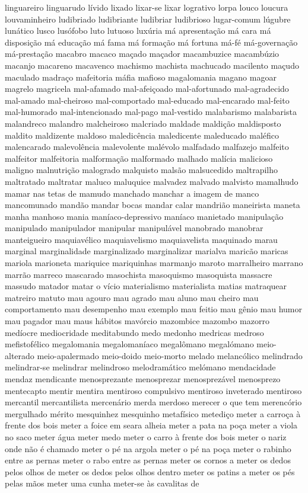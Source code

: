 linguareiro linguarudo l\'{i}vido lixado lixar-se lixar logrativo lorpa louco loucura louvaminheiro ludibriado ludibriante ludibriar ludibrioso lugar-comum l\'{u}gubre lun\'{a}tico lusco lus\'{o}fobo luto lutuoso lux\'{u}ria m\'{a} apresenta\c{c}\~ao m\'{a} cara m\'{a} disposi\c{c}\~ao m\'{a} educa\c{c}\~ao m\'{a} fama m\'{a} forma\c{c}\~ao m\'{a} fortuna m\'{a}-f\'{e} m\'{a}-governa\c{c}\~ao m\'{a}-presta\c{c}\~ao macabro macaco ma\c{c}ado ma\c{c}ador macambuzice macamb\'{u}zio macanjo macareno macavenco machismo machista machucado macilento ma\c{c}udo maculado madra\c{c}o mafeitoria m\'{a}fia mafioso magalomania magano magoar magrelo magricela mal-afamado mal-afei\c{c}oado mal-afortunado mal-agradecido mal-amado mal-cheiroso mal-comportado mal-educado mal-encarado mal-feito mal-humorado mal-intencionado mal-pago mal-vestido malabarismo malabarista malandreco malandro malcheiroso malcriado maldade maldi\c{c}\~ao maldisposto maldito maldizente maldoso maledic\^{e}ncia maledicente maleducado mal\'{e}fico malencarado malevol\^{e}ncia malevolente mal\'{e}volo malfadado malfazejo malfeito malfeitor malfeitoria malforma\c{c}\~ao malformado malhado mal\'{i}cia malicioso maligno malnutri\c{c}\~ao malogrado malquisto mals\~ao malsucedido maltrapilho maltratado maltratar maluco maluquice malvadez malvado malvisto mamalhudo mamar nas tetas de mamudo manchado manchar a imagem de manco mancomunado mand\~ao mandar bocas mandar calar mandri\~ao maneirista maneta manha manhoso mania man\'{i}aco-depressivo man\'{i}aco manietado manipula\c{c}\~ao manipulado manipulador manipular manipul\'{a}vel manobrado manobrar manteigueiro maquiav\'{e}lico maquiavelismo maquiavelista maquinado marau marginal marginalidade marginalizado marginalizar marialva maric\~ao maricas mariola marioneta mariquice mariquinhas marmanjo maroto marralheiro marrano marr\~ao marreco mascarado masochista masoquismo masoquista massacre massudo matador matar o v\'{i}cio materialismo materialista matias matraquear matreiro matuto mau agouro mau agrado mau aluno mau cheiro mau comportamento mau desempenho mau exemplo mau feitio mau g\^{e}nio mau humor mau pagador mau maus h\'{a}bitos mav\'{o}rcio mazombice mazombo mazorro med\'{i}ocre mediocridade meditabundo medo medonho medricas medroso mefistof\'{e}lico megalomania megaloman\'{i}aco megal\^{o}mano megal\'{o}mano meio-alterado meio-apalermado meio-doido meio-morto melado melanc\'{o}lico melindrado melindrar-se melindrar melindroso melodram\'{a}tico mel\'{o}mano mendacidade mendaz mendicante menosprezante menosprezar menosprez\'{a}vel menosprezo mentecapto mentir mentira mentiroso compulsivo mentiroso inveterado mentiroso mercantil mercantilista mercen\'{a}rio merda merdoso merecer o que tem merenc\'{o}rio mergulhado m\'{e}rito mesquinhez mesquinho metaf\'{i}sico metedi\c{c}o meter a carro\c{c}a \`{a} frente dos bois meter a foice em seara alheia meter a pata na po\c{c}a meter a viola no saco meter \'{a}gua meter medo meter o carro \`{a} frente dos bois meter o nariz onde n\~ao \'{e} chamado meter o p\'{e} na argola meter o p\'{e} na po\c{c}a meter o rabinho entre as pernas meter o rabo entre as pernas meter os cornos a meter os dedos pelos olhos de meter os dedos pelos olhos dentro meter os patins a meter os p\'{e}s pelas m\~aos meter uma cunha meter-se \`{a}s cavalitas de 
